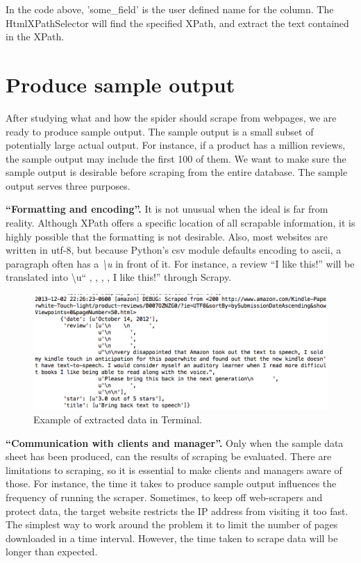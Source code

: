 \documentclass[12pt]{report}
\begin{document}
In the code above, 'some_field' is the user defined name for the column. The HtmlXPathSelector will find the specified XPath, and extract the text contained in the XPath.

\section{Produce sample output}

After studying what and how the spider should scrape from webpages, we are ready to produce sample output. The sample output is a small subset of potentially large actual output. For instance, if a product has a million reviews, the sample output may include the first 100 of them. We want to make sure the sample output is desirable before scraping from the entire database. The sample output serves three purposes.

\textbf{``Formatting and encoding''.} It is not unusual when the ideal is far from reality. Although XPath offers a specific location of all scrapable information, it is highly possible that the formatting is not desirable. Also, most websites are written in utf-8, but because Python's csv module defaults encoding to ascii, a paragraph often has a \textit{\textbackslash u} in front of it. For instance, a review ``I like this!'' will be translated into \textbackslash u``   ,    ,    ,   , I like this!'' through Scrapy.
\begin{figure}[htp]
\includegraphics[width=\textwidth]{scrapy_screenshot_terminal.png}
\caption[Scrapy screenshot in Mac Terminal]
{Example of extracted data in Terminal.}
\end{figure}

\textbf{``Communication with clients and manager''.} Only when the sample data sheet has been produced, can the results of scraping be evaluated. There are limitations to scraping, so it is essential to make clients and managers aware of those. For instance, the time it takes to produce sample output influences the frequency of running the scraper. Sometimes, to keep off web-scrapers and protect data, the target website restricts the IP address from visiting it too fast. The simplest way to work around the problem it to limit the number of pages downloaded in a time interval. However, the time taken to scrape data will be longer than expected.
\end{document}
